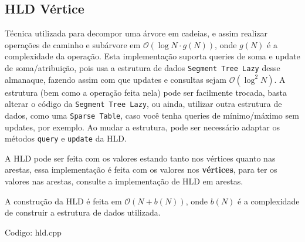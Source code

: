 \documentclass[10pt, a4paper, oneside]{book}
\begin{document}
\subsection{HLD Vértice}


Técnica utilizada para decompor uma árvore em cadeias, e assim realizar operações de caminho e subárvore em $\mathcal{O}(\log N \cdot g(N))$, onde $g(N)$ é a complexidade da operação. Esta implementação suporta queries de soma e update de soma/atribuição, pois usa a estrutura de dados \texttt{Segment Tree Lazy} desse almanaque, fazendo assim com que updates e consultas sejam  $\mathcal{O}(\log^2 N)$. A estrutura (bem como a operação feita nela) pode ser facilmente trocada, basta alterar o código da \texttt{Segment Tree Lazy}, ou ainda, utilizar outra estrutura de dados, como uma \texttt{Sparse Table}, caso você tenha queries de mínimo/máximo sem updates, por exemplo. Ao mudar a estrutura, pode ser necessário adaptar os métodos \texttt{query} e \texttt{update} da HLD.



A HLD pode ser feita com os valores estando tanto nos vértices quanto nas arestas, essa implementação é feita com os valores nos \textbf{vértices}, para ter os valores nas arestas, consulte a implementação de HLD em arestas.



A construção da HLD é feita em $\mathcal{O}(N + b(N))$, onde $b(N)$ é a complexidade de construir a estrutura de dados utilizada.
\hfill

Codigo: hld.cpp
\end{document}
